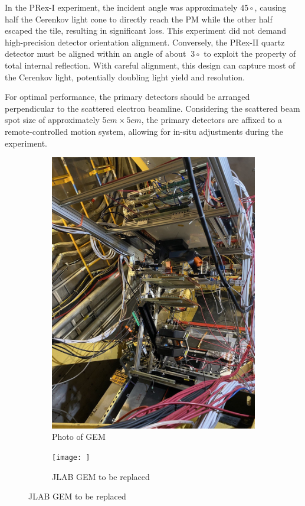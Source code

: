 In the PRex-I experiment, the incident angle was approximately $45\circ$, causing half the Cerenkov light cone to directly reach the PM while the other half escaped the tile, resulting in significant loss. This experiment did not demand high-precision detector orientation alignment. Conversely, the PRex-II quartz detector must be aligned within an angle of about $~3\circ$ to exploit the property of total internal reflection. With careful alignment, this design can capture most of the Cerenkov light, potentially doubling light yield and resolution.

For optimal performance, the primary detectors should be arranged perpendicular to the scattered electron beamline. Considering the scattered beam spot size of approximately $5cm \times 5cm$, the primary detectors are affixed to a remote-controlled motion system, allowing for in-situ adjustments during the experiment.


\begin{figure}
     \centering
     \begin{subfigure}[b]{0.45\textwidth}
         \centering
         \includegraphics[width=\textwidth]{images/chap3/quartz_at.jpg}
         \caption{Photo of GEM}
         \label{Photo of CEBAF}
     \end{subfigure}
     \hfill
     \begin{subfigure}[b]{0.45\textwidth}
         \centering
         \texttt{[image: ]}
         \caption{JLAB GEM to be replaced}
         \label{gem_structure}
     \end{subfigure}
\end{figure}


